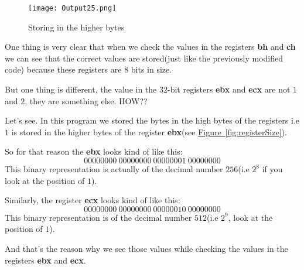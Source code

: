 \documentclass{article}
\begin{document}
\begin{figure}[h]
\centering
\texttt{[image: Output25.png]}
\caption{Storing in the higher bytes}
\label{fig:storeHighB}
\end{figure}

One thing is very clear that when we check the values in the registers \textbf{bh} and \textbf{ch} we can see that the correct values are stored(just like the previously modified code) because these registers are $8$ bits in size.

But one thing is different, the value in the $32$-bit registers \textbf{ebx} and \textbf{ecx} are not $1$ and $2$, they are something else. HOW??

\vspace{10pt}
Let's see. In this program we stored the bytes in the high bytes of the registers i.e $1$ is stored in the higher bytes of the register \textbf{ebx}(see \hyperref[fig:registerSize]{Figure~\ref*{fig:registerSize}}).

\vspace{10pt}
So for that reason the \textbf{ebx} looks kind of like this:
$$
00000000\ 00000000\ 00000001\ 00000000
$$
\newpage
This binary representation is actually of the decimal number $256$(i.e $2^8$ if you look at the position of $1$).

\vspace{10pt}
Similarly, the register \textbf{ecx} looks kind of like this:
$$
00000000\ 00000000\ 00000010\ 00000000
$$
This binary representation is of the decimal number $512$(i.e $2^9$, look at the position of $1$).

And that's the reason why we see those values while checking the values in the registers \textbf{ebx} and \textbf{ecx}.
\end{document}
